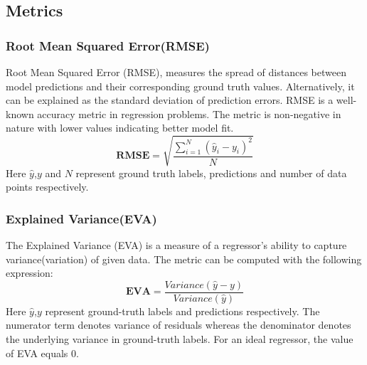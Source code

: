 \subsection{Metrics}
\subsubsection{Root Mean Squared Error(RMSE)}
Root Mean Squared Error (RMSE), measures the spread of distances between model predictions and their corresponding ground truth values. Alternatively, it can be explained as the standard deviation of prediction errors. RMSE is a well-known accuracy metric in regression problems. The metric is non-negative in nature with lower values indicating better model fit.
\begin{equation}
	\mathbf{RMSE} = \sqrt{\frac{\sum_{i=1}^{N}(\hat{y}_i-y_i)^2}{N}}
\end{equation}
Here $\hat{y}$,$y$ and $N$ represent ground truth labels, predictions and number of data points respectively.
\subsubsection{Explained Variance(EVA)}
The Explained Variance (EVA) is a measure of a regressor's ability to capture variance(variation) of given data. The metric can be computed with the following expression:
\begin{equation}
	\mathbf{EVA} = \frac{Variance(\hat{y}-y)}{Variance(\hat{y})}
\end{equation}
Here $\hat{y}$,$y$ represent ground-truth labels and predictions respectively. The numerator term denotes variance of residuals whereas the denominator denotes the underlying variance in ground-truth labels. For an ideal regressor, the value of EVA equals 0.
